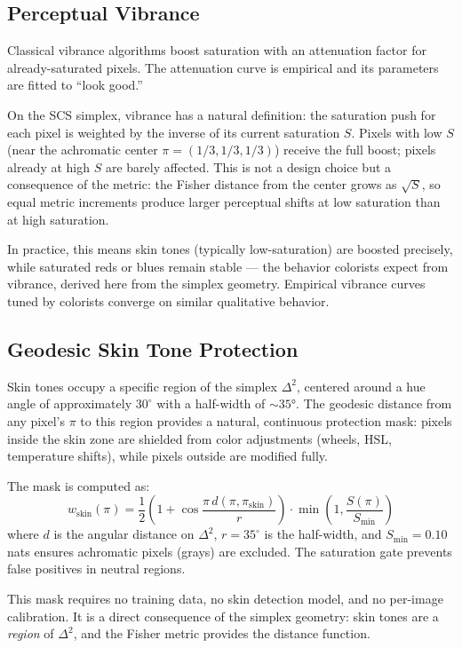 \documentclass[12pt,a4paper]{article}
\begin{document}
\subsection{Perceptual Vibrance}

Classical vibrance algorithms boost saturation with an attenuation
factor for already-saturated pixels. The attenuation curve is
empirical and its parameters are fitted to ``look good.''

On the SCS simplex, vibrance has a natural definition: the saturation
push for each pixel is weighted by the inverse of its current
saturation $S$. Pixels with low $S$ (near the achromatic center
$\pi = (1/3, 1/3, 1/3)$) receive the full boost; pixels already at
high $S$ are barely affected. This is not a design choice but a
consequence of the metric: the Fisher distance from the center grows
as $\sqrt{S}$, so equal metric increments produce larger perceptual
shifts at low saturation than at high saturation.

In practice, this means skin tones (typically low-saturation) are
boosted precisely, while saturated reds or blues remain stable ---
the behavior colorists expect from vibrance, derived here from the
simplex geometry. Empirical vibrance curves tuned by colorists
converge on similar qualitative behavior.

\subsection{Geodesic Skin Tone Protection}

Skin tones occupy a specific region of the simplex $\Delta^2$,
centered around a hue angle of approximately $30^\circ$ with a half-width
of $\sim 35°$. The geodesic distance from any pixel's $\pi$ to this
region provides a natural, continuous protection mask: pixels inside
the skin zone are shielded from color adjustments (wheels, HSL,
temperature shifts), while pixels outside are modified fully.

The mask is computed as:
\[
  w_\mathrm{skin}(\pi) = \frac{1}{2}\left(1 + \cos\frac{\pi\, d(\pi, \pi_\mathrm{skin})}{r}\right) \cdot \min\!\left(1, \frac{S(\pi)}{S_\mathrm{min}}\right)
\]
where $d$ is the angular distance on $\Delta^2$, $r = 35^\circ$ is the
half-width, and $S_\mathrm{min} = 0.10$ nats ensures achromatic
pixels (grays) are excluded. The saturation gate prevents false
positives in neutral regions.

This mask requires no training data, no skin detection model, and no
per-image calibration. It is a direct consequence of the simplex
geometry: skin tones are a \emph{region} of $\Delta^2$, and the
Fisher metric provides the distance function.
\end{document}
